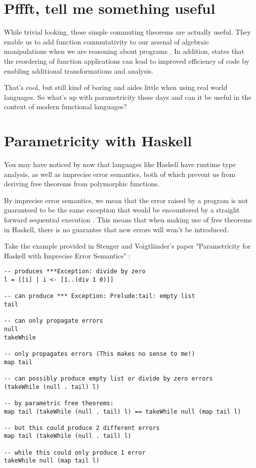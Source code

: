 \section{Pffft, tell me something useful}
While trivial looking, these simple commuting theorems are actually useful. They enable us to add function commutativity to our arsenal of algebraic manipulations when we are reasoning about programs \cite{theoremsForFree}. In addition, \cite{impreciseSemantics} states that the reordering of function applications can lead to improved efficiency of code by enabling additional transformations and analysis.

That's cool, but still kind of boring and aides little when using real world languages. So what's up with parametricity these days and can it be useful in the context of modern functional languages?

\section{Parametricity with Haskell}
You may have noticed by now that languages like Haskell have runtime type analysis, as well as imprecise error semantics, both of which prevent us from deriving free theorems from polymorphic functions.

By imprecise error semantics, we mean that the error raised by a program is not guaranteed to be the same exception that would be encountered by a straight forward sequential execution \cite{jonesSemantics}. This means that when making use of free theorems in Haskell, there is no guarantee that new errors will won't be introduced.

Take the example provided in Stenger and Voigtländer's paper "Parametricity for Haskell with Imprecise Error Semantics" \cite{impreciseSemantics}:
\begin{verbatim}
-- produces ***Exception: divide by zero
l = [[i] | i <- [1..(div 1 0)]]

-- can produce *** Exception: Prelude:tail: empty list
tail

-- can only propagate errors
null
takeWhile

-- only propagates errors (This makes no sense to me!)
map tail

-- can possibly produce empty list or divide by zero errors
(takeWhile (null . tail) l)

-- by parametric free theorems:
map tail (takeWhile (null . tail) l) == takeWhile null (map tail l)

-- but this could produce 2 different errors
map tail (takeWhile (null . tail) l)

-- while this could only produce 1 error
takeWhile null (map tail l)
\end{verbatim}

